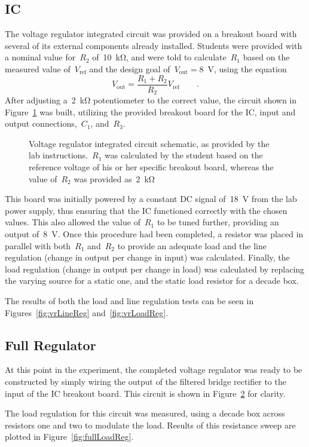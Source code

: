 \subsection{IC}
The voltage regulator integrated circuit was provided on a breakout board with
several of its external components already installed.  Students were provided
with a nominal value for~$R_2$ of~\SI{10}{\kilo\ohm}, and were told to
calculate~$R_1$ based on the measured value of~$V_\text{ref}$ and the design
goal of~$V_\text{out} = $\SI{8}{\volt}, using the equation
%
\begin{equation}
	V_\text{out} = \frac{R_1 + R_2}{R_2} V_\text{ref} \qquad \text{.}
	\label{eq:calcR1}
\end{equation}
%
After adjusting a~\SI{2}{\kilo\ohm} potentiometer to the correct value, the
circuit shown in Figure~\ref{fig:icSchem} was built, utilizing the provided
breakout board for the IC, input and output connections,~$C_1$, and~$R_3$.
%
\begin{figure}[H]
	\centering
	
	\parbox{.6\textwidth}{
	\caption{Voltage regulator integrated circuit schematic, as provided by the
	lab instructions.~$R_1$ was calculated by the student based on the
	reference voltage of his or her specific breakout board, whereas the value
	of~$R_2$ was provided as~\SI{2}{\kilo\ohm}}
	\label{fig:icSchem}
	}
\end{figure}
%
This board was initially powered by a constant DC signal of~\SI{18}{\volt} from
the lab power supply, thus ensuring that the IC functioned correctly with the
chosen values.  This also allowed the value of~$R_1$ to be tuned further,
providing an output of~\SI{8}{\volt}.  Once this procedure had been completed,
a resistor was placed in parallel with both~$R_1$ and~$R_2$ to provide an
adequate load and the line regulation (change in output per change in input)
was calculated.  Finally, the load regulation (change in output per change in
load) was calculated by replacing the varying source for a static one, and the
static load resistor for a decade box.

The results of both the load and line regulation tests can be seen in
Figures~\ref{fig:vrLineReg} and~\ref{fig:vrLoadReg}.

\subsection{Full Regulator}
At this point in the experiment, the completed voltage regulator was ready to
be constructed by simply wiring the output of the filtered bridge rectifier to
the input of the IC breakout board.  This circuit is shown in
Figure~\ref{fig:fullSchem} for clarity.
%
\begin{figure}[H]
	\centering
	
	\caption{}
	\label{fig:fullSchem}
\end{figure}
%
The load regulation for this circuit was measured, using a decade box across
resistors one and two to modulate the load.  Results of this resistance sweep
are plotted in Figure~\ref{fig:fullLoadReg}.
